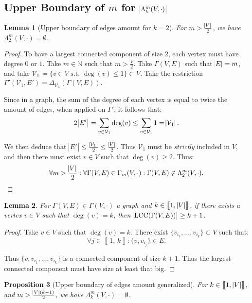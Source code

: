 \documentclass{article}
\newtheorem{lemma}{Lemma}[section]
\newtheorem{proposition}[lemma]{Proposition}
\theoremstyle{definition}
\theoremstyle{remark}
\DeclareMathOperator{\LCC}{LCC}
\newcommand{\N}{\mathbb N}
\newcommand{\intint}[2]{\left\llbracket#1, \, #2\right\rrbracket}
\newcommand{\st}{\text{ s.t. }}
\begin{document}
	\subsection{Upper Boundary of $m$ for $\abs {\Lambda_k^m(V, \cdot)}$}
		\begin{lemma}[Upper boundary of edges amount for $k=2$]\label{lemma:upper boundary k=2} For $m > \frac {\abs V}2$, we have $\Lambda_2^m(V, \cdot) = \emptyset$.
		\end{lemma}

		\begin{proof} To have a largest connected component of size $2$, each vertex must have degree $0$ or $1$. Take $m \in \N$ such that $m > \frac V2$. Take
		$\Gamma(V, E)$ such that $\abs E = m$, and take $\mathcal V_1 \coloneqq \{v \in V \st \deg(v) \leq 1\} \subset V$. Take the restriction
		$\Gamma'(\mathcal V_1, E') = \Delta_{\mathcal V_1}(\Gamma(V, E))$.

		Since in a graph, the sum of the degree of each vertex is equal to twice the amount of edges, when applied on $\Gamma'$, it follows that:
		\[2\abs {E'} = \sum_{v \in \mathcal V_1}\deg(v) \leq \sum_{v \in \mathcal V_1}1 = \abs {\mathcal V_1}.\]

		We then deduce that $\abs {E'} \leq \frac {\abs {\mathcal V_1}}2 \leq \frac {\abs V}2$. Thus $\mathcal V_1$ must be \textit{strictly} included in $V$,
		and then there must exist $v \in V$ such that $\deg(v) \geq 2$. Thus:
		\[\forall m > \frac {\abs V}2 : \forall \Gamma(V, E) \in \Gamma_m(V, \cdot) : \Gamma(V, E) \not \in \Lambda_2^m(V, \cdot).\]
		\end{proof}

		\begin{lemma} For $\Gamma(V, E) \in \Gamma(V, \cdot)$ a graph and $k \in \intint 1{\abs V}$, if there exists a vertex $v \in V$ such that $\deg(v) = k$,
		then $\abs {\LCC(\Gamma(V, E))} \geq k+1$.
		\end{lemma}

		\begin{proof} Take $v \in V$ such that $\deg(v) = k$. There exist $\{v_{i_1}, \ldots, v_{i_k}\} \subset V$ such that:
		\[\forall j \in \intint 1k : \{v, v_{i_j}\} \in E.\]

		Thus $\{v, v_{i_1}, \ldots, v_{i_k}\}$ is a connected component of size $k+1$. Thus the largest connected component must have size at least that big.
		\end{proof}

		\begin{proposition}[Upper boundary of edges amount generalized] For $k \in \intint 1{\abs V}$, and $m > \frac {\abs V(k-1)}2$, we have $\Lambda_k^m(V, \cdot) = \emptyset$.
		\end{proposition}
\end{document}

